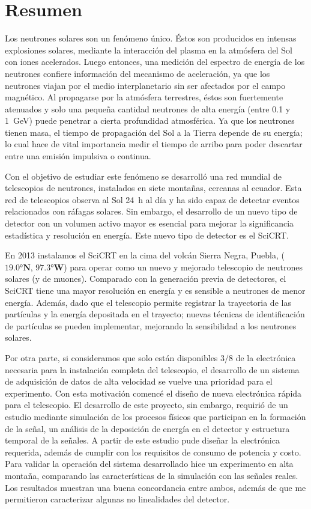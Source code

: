 \pagestyle{empty}
\chapter{Resumen}

Los neutrones solares son un fenómeno único. Éstos son producidos en intensas explosiones solares, mediante la interacción del plasma en la atmósfera del Sol con iones acelerados. Luego entonces, una medición del espectro de energía de los neutrones confiere información del mecanismo de aceleración, ya que  los neutrones viajan por el medio interplanetario sin ser afectados por el campo magnético. Al propagarse por la atmósfera terrestres, éstos son fuertemente atenuados y solo una pequeña cantidad neutrones de alta energía (entre \num{0.1} y \SI{1}{\giga\electronvolt}) puede penetrar a cierta profundidad atmosférica. Ya que los neutrones tienen masa, el tiempo de propagación del Sol a la Tierra depende de su energía; lo cual hace de vital importancia medir el tiempo de arribo para poder descartar entre una emisión impulsiva o continua.

Con el objetivo de estudiar este fenómeno se desarrolló una red mundial de telescopios de neutrones, instalados en siete montañas, cercanas al ecuador. Esta red de telescopios observa al Sol \SI{24}{\hour} al día y ha sido capaz de detectar eventos relacionados con ráfagas solares. Sin embargo, el desarrollo de un nuevo tipo de detector con un volumen activo mayor es esencial para mejorar la significancia estadística y resolución en energía. Este nuevo tipo de detector es el SciCRT.

En \num{2013} instalamos el SciCRT en la cima del volcán Sierra Negra, Puebla, ($\ang{19.0}\mathbf{N}$, $\ang{97.3}\mathbf{W}$) para operar como un nuevo y mejorado telescopio de neutrones solares (y de muones). Comparado con la generación previa de detectores, el SciCRT tiene una mayor resolución en energía y es sensible a neutrones de menor energía. Además, dado que el telescopio permite registrar la trayectoria de las partículas y la energía depositada en el trayecto; nuevas técnicas de identificación de partículas se pueden implementar, mejorando la sensibilidad a los neutrones solares.

Por otra parte, si consideramos que solo están disponibles $3/8$ de la electrónica necesaria para la instalación completa del telescopio, el desarrollo de un sistema de adquisición de datos de alta velocidad se vuelve una prioridad para el experimento. Con esta motivación comencé el diseño de nueva electrónica rápida para el telescopio. El desarrollo de este proyecto, sin embargo, requirió de un estudio mediante simulación de los procesos físicos que participan en la formación de la señal, un análisis de la deposición de energía en el detector y estructura temporal de la señales. A partir de este estudio pude diseñar la electrónica requerida, además de cumplir con los requisitos de consumo de potencia y costo. Para validar la operación del sistema desarrollado hice un experimento en alta montaña, comparando las características de la simulación con las señales reales. Los resultados muestran una buena concordancia entre ambos, además de que me permitieron caracterizar algunas no linealidades del detector.

